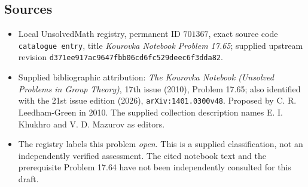 \documentclass[11pt]{article}
\begin{document}
\subsection{Sources}
\begin{itemize}
\item Local UnsolvedMath registry, permanent ID \(701367\), exact source code \texttt{catalogue entry}, title \emph{Kourovka Notebook Problem 17.65}; supplied upstream revision \texttt{d371ee917ac9647fbb06cd6fc529deec6f3dda82}.
\item Supplied bibliographic attribution: \emph{The Kourovka Notebook (Unsolved Problems in Group Theory)}, 17th issue (2010), Problem 17.65; also identified with the 21st issue edition (2026), \texttt{arXiv:1401.0300v48}. Proposed by C. R. Leedham-Green in 2010. The supplied collection description names E. I. Khukhro and V. D. Mazurov as editors.
\item The registry labels this problem \emph{open}. This is a supplied classification, not an independently verified assessment. The cited notebook text and the prerequisite Problem 17.64 have not been independently consulted for this draft.
\end{itemize}
\end{document}
